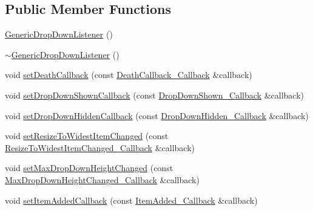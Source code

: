 \subsection*{Public Member Functions}
\begin{DoxyCompactItemize}
\item 
\mbox{\hyperlink{classec_1_1_generic_drop_down_listener_ab0f41e6d3614c6c367de876820dbc14a}{Generic\+Drop\+Down\+Listener}} ()
\item 
\mbox{\hyperlink{classec_1_1_generic_drop_down_listener_a7e3e68d403e669dcf4205e0d235a752e}{$\sim$\+Generic\+Drop\+Down\+Listener}} ()
\item 
void \mbox{\hyperlink{classec_1_1_generic_drop_down_listener_a6fac243931f048ee2cc55ec1ffa5ccf4}{set\+Death\+Callback}} (const \mbox{\hyperlink{classec_1_1_generic_drop_down_listener_a72a84eeb2fdcc0eae78b78c53a59db3b}{Death\+Callback\+\_\+\+Callback}} \&callback)
\item 
void \mbox{\hyperlink{classec_1_1_generic_drop_down_listener_ae5bf872ddc31e7c456eb017ac7906381}{set\+Drop\+Down\+Shown\+Callback}} (const \mbox{\hyperlink{classec_1_1_generic_drop_down_listener_ac5e0a45750cc64cb003f20d438047ddd}{Drop\+Down\+Shown\+\_\+\+Callback}} \&callback)
\item 
void \mbox{\hyperlink{classec_1_1_generic_drop_down_listener_a3960331abcb033fbace69f59e875cadd}{set\+Drop\+Down\+Hidden\+Callback}} (const \mbox{\hyperlink{classec_1_1_generic_drop_down_listener_ae0548e780805b39f5817e6659932b478}{Drop\+Down\+Hidden\+\_\+\+Callback}} \&callback)
\item 
void \mbox{\hyperlink{classec_1_1_generic_drop_down_listener_a21fbfc8758a5829d06a0fc589a93c87c}{set\+Resize\+To\+Widest\+Item\+Changed}} (const \mbox{\hyperlink{classec_1_1_generic_drop_down_listener_a3a4f9e1a8d9e016ea30e8cc781b8bcb9}{Resize\+To\+Widest\+Item\+Changed\+\_\+\+Callback}} \&callback)
\item 
void \mbox{\hyperlink{classec_1_1_generic_drop_down_listener_ae6abf1bd443a68747844d7ca913cff96}{set\+Max\+Drop\+Down\+Height\+Changed}} (const \mbox{\hyperlink{classec_1_1_generic_drop_down_listener_a4acbadec20937340572893a989e248f1}{Max\+Drop\+Down\+Height\+Changed\+\_\+\+Callback}} \&callback)
\item 
void \mbox{\hyperlink{classec_1_1_generic_drop_down_listener_a136be24656c12294dc6e29ba7269a47a}{set\+Item\+Added\+Callback}} (const \mbox{\hyperlink{classec_1_1_generic_drop_down_listener_a3b5721d086e03a50097fa2bd37e4030a}{Item\+Added\+\_\+\+Callback}} \&callback)
\item 

\end{DoxyCompactItemize}
